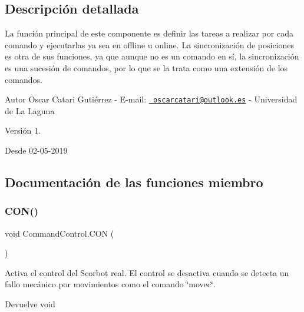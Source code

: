 \subsection{Descripción detallada}
La función principal de este componente es definir las tareas a realizar por cada comando y ejecutarlas ya sea en offline u online. La sincronización de posiciones es otra de sus funciones, ya que aunque no es un comando en sí, la sincronización es una sucesión de comandos, por lo que se la trata como una extensión de los comandos. \begin{DoxyAuthor}{Autor}
Oscar Catari Gutiérrez -\/ E-\/mail\+: \href{mailto:oscarcatari@outlook.es}{\texttt{ oscarcatari@outlook.\+es}} -\/ Universidad de La Laguna 
\end{DoxyAuthor}
\begin{DoxyVersion}{Versión}
1. 
\end{DoxyVersion}
\begin{DoxySince}{Desde}
02-\/05-\/2019 
\end{DoxySince}


\subsection{Documentación de las funciones miembro}
\mbox{\label{class_command_control_a951dd9ecf782547f973c12db75c6f29a}} 
\subsubsection{\texorpdfstring{CON()}{CON()}}
{\footnotesize\ttfamily void Command\+Control.\+C\+ON (\begin{DoxyParamCaption}{ }\end{DoxyParamCaption})\hspace{0.3cm}{\ttfamily [inline]}}

Activa el control del Scorbot real. El control se desactiva cuando se detecta un fallo mecánico por movimientos como el comando \char`\"{}movec\char`\"{}. \begin{DoxyReturn}{Devuelve}
void 
\end{DoxyReturn}
\mbox{\label{class_command_control_ada99694b0c348a0256faebab0899333b}} 
